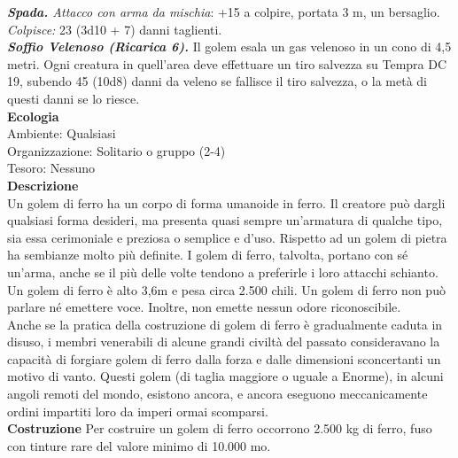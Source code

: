 \begin{multicols}{2}
\emph{\textbf{Spada.} Attacco con arma da mischia}: +15 a colpire, portata 3 m, un bersaglio.\\
\emph{Colpisce:} 23 (3d10 + 7) danni taglienti.\\
\emph{\textbf{Soffio Velenoso (Ricarica 6).}} Il golem esala un gas velenoso in un cono di 4,5 metri. Ogni creatura in quell'area deve effettuare un tiro salvezza su Tempra DC 19, subendo 45 (10d8) danni da veleno se fallisce il tiro salvezza, o la metà di questi danni se lo riesce.\\
\textbf{Ecologia}\\
Ambiente: Qualsiasi\\
Organizzazione: Solitario o gruppo (2-4)\\
Tesoro: Nessuno\\
\textbf{Descrizione}\\
Un golem di ferro ha un corpo di forma umanoide in ferro. Il creatore può dargli qualsiasi forma desideri, ma presenta quasi sempre un'armatura di qualche tipo, sia essa cerimoniale e preziosa o semplice e d'uso. Rispetto ad un golem di pietra ha sembianze molto più definite. I golem di ferro, talvolta, portano con sé un'arma, anche se il più delle volte tendono a preferirle i loro attacchi schianto.\\

Un golem di ferro è alto 3,6m e pesa circa 2.500 chili. Un golem di ferro non può parlare né emettere voce. Inoltre, non emette nessun odore riconoscibile.\\

Anche se la pratica della costruzione di golem di ferro è gradualmente caduta in disuso, i membri venerabili di alcune grandi civiltà del passato consideravano la capacità di forgiare golem di ferro dalla forza e dalle dimensioni sconcertanti un motivo di vanto. Questi golem (di taglia maggiore o uguale a Enorme), in alcuni angoli remoti del mondo, esistono ancora, e ancora eseguono meccanicamente ordini impartiti loro da imperi ormai scomparsi.\\

\textbf{Costruzione}
Per costruire un golem di ferro occorrono 2.500 kg di ferro, fuso con tinture rare del valore minimo di 10.000 mo.\\


\end{multicols}
